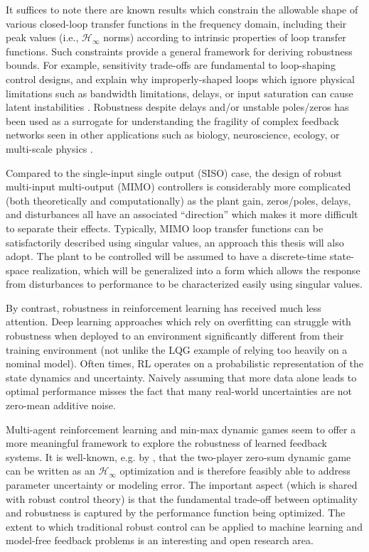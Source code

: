 It suffices to note there are known results which constrain the allowable shape of various closed-loop transfer functions in the frequency domain, including their peak values (i.e., $\mathcal{H}_{\infty}$ norms) according to intrinsic properties of loop transfer functions.  Such constraints provide a general framework for deriving robustness bounds.  For example, sensitivity trade-offs are fundamental to loop-shaping control designs, and explain why improperly-shaped loops which ignore physical limitations such as bandwidth limitations, delays, or input saturation can cause latent instabilities \cite{stein2003respect}.  Robustness despite delays and/or unstable poles/zeros has been used as a surrogate for understanding the fragility of complex feedback networks seen in other applications such as biology, neuroscience, ecology, or multi-scale physics \cite{doyle2011universal, leong2016understanding, doyle2017universal}.

Compared to the single-input single output (SISO) case, the design of robust multi-input multi-output (MIMO) controllers is considerably more complicated (both theoretically and computationally) as the plant gain, zeros/poles, delays, and disturbances all have an associated ``direction'' which makes it more difficult to separate their effects.  Typically, MIMO loop transfer functions can be satisfactorily described using singular values, an approach this thesis will also adopt.  The plant to be controlled will be assumed to have a discrete-time state-space realization, which will be generalized into a form which allows the response from disturbances to performance to be characterized easily using singular values.

By contrast, robustness in reinforcement learning has received much less attention.  Deep learning approaches which rely on overfitting can struggle with robustness when deployed to an environment significantly different from their training environment (not unlike the LQG example of relying too heavily on a nominal model).  Often times, RL operates on a probabilistic representation of the state dynamics and uncertainty.  Naively assuming that more data alone leads to optimal performance misses the fact that many real-world uncertainties are not zero-mean additive noise.

Multi-agent reinforcement learning and min-max dynamic games seem to offer a more meaningful framework to explore the robustness of learned feedback systems.  It is well-known, e.g. by \cite{basar1989dynamic, rhee1991game, lee1990interconnections, bernhard1991lecture, bacsar2008h}, that the two-player zero-sum dynamic game can be written as an $\mathcal{H}_{\infty}$ optimization and is therefore feasibly able to address parameter uncertainty or modeling error.  The important aspect (which is shared with robust control theory) is that the fundamental trade-off between optimality and robustness is captured by the performance function being optimized.  The extent to which traditional robust control can be applied to machine learning and model-free feedback problems is an interesting and open research area.

